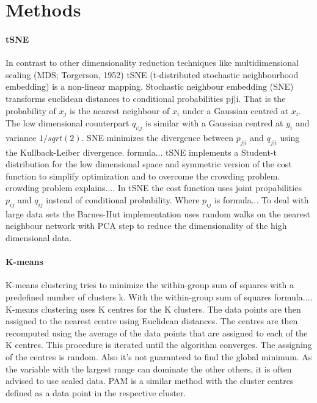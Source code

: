\documentclass{article}\usepackage[]{graphicx}\usepackage[]{color}
\begin{document}
\section{Methods}

\paragraph{tSNE}

 In contrast to other dimensionality reduction techniques like  multidimensional scaling (MDS; Torgerson, 1952) tSNE (t-distributed stochastic neighbourhood embedding) is a non-linear mapping. Stochastic neighbour embedding (SNE) transforms euclidean distances to conditional probabilities p{j|i}. That is the probability of \(x_j\) is the nearest neighbour of $x_i$ under a Gaussian centred at $x_i$. The low dimensional counterpart $q_{i|j}$ is similar with a Gaussian centred at $y_i$ and variance $1/sqrt(2)$. SNE minimizes the divergence between $p_{j|i}$ and $q_{j|i}$ using the Kullback-Leiber divergence. formula...
tSNE implements a Student-t distribution for the low dimensional space and symmetric version of the cost function to simplify optimization and to overcome the crowding problem. crowding problem explains.... 
In tSNE the cost function uses joint propabilities $p_{ij}$ and $q_{ij}$  instead of conditional probability. Where $p_{ij}$ is formula...
To deal with large data sets the Barnes-Hut implementation uses random walks on the nearest neighbour network with PCA step to reduce the dimensionality of the high dimensional data.

\paragraph{K-means}
K-means clustering tries to minimize the within-group sum of squares with a predefined number of clusters k. With the within-group sum of squares formula....
K-means clustering uses K centres for the K clusters. The data points are then assigned to the nearest centre using Euclidean distances. The centres are then recomputed using the average of the data points that are assigned to each of the K centres. This procedure is iterated until the algorithm converges. The assigning of the centres is random. Also it's not guaranteed to find the global minimum.  As the variable with the largest range can dominate the other others, it is often advised to use scaled data.
PAM is a similar method with the cluster centres defined as a data point in the respective cluster.
\end{document}

